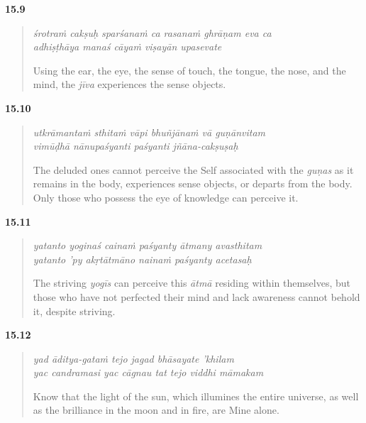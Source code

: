 \par\noindent\textbf{15.9}\par
\begin{verse}
\textit{śrotraṁ cakṣuḥ sparśanaṁ ca rasanaṁ ghrāṇam eva ca} \\
\textit{adhiṣṭhāya manaś cāyaṁ viṣayān upasevate}

\noindent Using the ear, the eye, the sense of touch, the tongue, the nose, and the mind, the \textit{jīva} experiences the sense objects.
\end{verse}
\par



\par\noindent\textbf{15.10}\par
\begin{verse}
\textit{utkrāmantaṁ sthitaṁ vāpi bhuñjānaṁ vā guṇānvitam} \\
\textit{vimūḍhā nānupaśyanti paśyanti jñāna-cakṣuṣaḥ}

\noindent The deluded ones cannot perceive the Self associated with the \textit{guṇas} as it remains in the body, experiences sense objects, or departs from the body. Only those who possess the eye of knowledge can perceive it.
\end{verse}
\par



\par\noindent\textbf{15.11}\par
\begin{verse}
\textit{yatanto yoginaś cainaṁ paśyanty ātmany avasthitam} \\
\textit{yatanto ’py akṛtātmāno nainaṁ paśyanty acetasaḥ}

\noindent The striving \textit{yogīs} can perceive this \textit{ātmā} residing within themselves, but those who have not perfected their mind and lack awareness cannot behold it, despite striving.
\end{verse}
\par



\par\noindent\textbf{15.12}\par
\begin{verse}
\textit{yad āditya-gataṁ tejo jagad bhāsayate ’khilam} \\
\textit{yac candramasi yac cāgnau tat tejo viddhi māmakam}

\noindent Know that the light of the sun, which illumines the entire universe, as well as the brilliance in the moon and in fire, are Mine alone.
\end{verse}
\par



